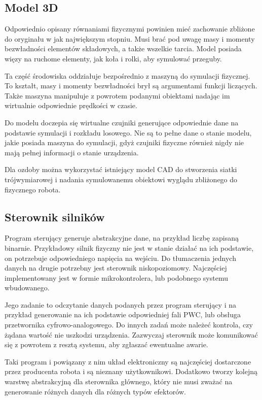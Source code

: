 \subsection{Model 3D}
 Odpowiednio opisany równaniami fizycznymi powinien mieć zachowanie zbliżone do oryginału w jak największym stopniu.
 Musi brać pod uwagę masy i momenty bezwładności elementów składowych, a także wszelkie tarcia.
 Model posiada więzy na ruchome elementy, jak koła i rolki, aby symulować przeguby.
 
 Ta część środowiska oddziałuje bezpośrednio z maszyną do symulacji fizycznej. 
 To kształt, masy i momenty bezwładności brył są argumentami funkcji liczących.
 Także maszyna manipuluje z powrotem podanymi obiektami nadając im wirtualnie odpowiednie prędkości w czasie.
 
 Do modelu doczepia się wirtualne czujniki generujące odpowiednie dane na podstawie symulacji i rozkładu losowego.
 Nie są to pełne dane o stanie modelu, jakie posiada maszyna do symulacji, gdyż czujniki fizyczne również nigdy nie mają pełnej informacji o stanie urządzenia.
 
 Dla ozdoby można wykorzystać istniejący model CAD do stworzenia siatki trójwymiarowej i nadania symulowanemu obiektowi wyglądu zbliżonego do fizycznego robota.

 \subsection{Sterownik silników}
Program sterujący generuje abstrakcyjne dane, na przykład liczbę zapisaną binarnie.
Przykładowy silnik fizyczny nie jest w stanie działać na ich podstawie, on potrzebuje odpowiedniego napięcia na wejściu.
Do tłumaczenia jednych danych na drugie potrzebny jest sterownik niskopoziomowy.
Najczęściej implementowany jest w formie mikrokontrolera, lub podobnego systemu wbudowanego.

Jego zadanie to odczytanie danych podanych przez program sterujący i na przykład generowanie na ich podstawie odpowiedniej fali PWC, lub obsługa przetwornika cyfrowo-analogowego.
Do innych zadań może należeć kontrola, czy żądana wartość nie uszkodzi urządzenia.
Zazwyczaj sterownik może komunikować się z powrotem z resztą systemu, aby zgłaszać ewentualne awarie.

Taki program i powiązany z nim układ elektroniczny są najczęściej dostarczone przez producenta robota i są nieznany użytkownikowi.
Dodatkowo tworzy kolejną warstwę abstrakcyjną dla sterownika głównego, który nie musi zważać na generowanie różnych danych dla różnych typów efektorów.
 
